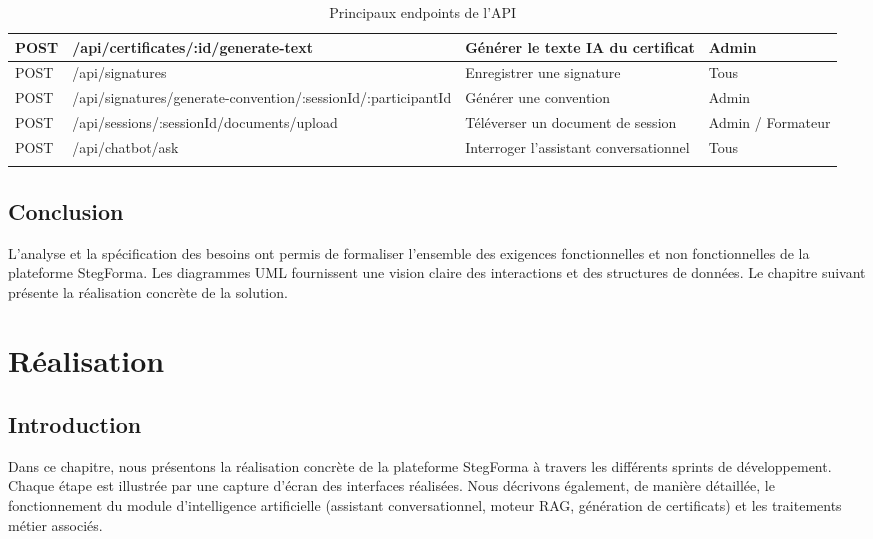 \documentclass[12pt,a4paper,oneside,openany]{report}
\begin{document}
\begin{longtable}{|l|l|p{5.4cm}|p{2.2cm}|}
\hline
POST & /api/certificates/:id/generate-text & Générer le texte IA du certificat & Admin \\
\hline
POST & /api/signatures & Enregistrer une signature & Tous \\
\hline
POST & /api/signatures/generate-convention/:sessionId/:participantId & Générer une convention & Admin \\
\hline
POST & /api/sessions/:sessionId/documents/upload & Téléverser un document de session & Admin / Formateur \\
\hline
POST & /api/chatbot/ask & Interroger l'assistant conversationnel & Tous \\
\hline
\caption{Principaux endpoints de l'API}
\label{tab:api}
\end{longtable}

\enlargethispage{2cm}

\section*{Conclusion}
\hrulefill

L'analyse et la spécification des besoins ont permis de formaliser l'ensemble des exigences fonctionnelles et non fonctionnelles de la plateforme StegForma. Les diagrammes UML fournissent une vision claire des interactions et des structures de données. Le chapitre suivant présente la réalisation concrète de la solution.

\chapter{Réalisation}

\section*{Introduction}

Dans ce chapitre, nous présentons la réalisation concrète de la plateforme StegForma à travers les différents sprints de développement. Chaque étape est illustrée par une capture d'écran des interfaces réalisées. Nous décrivons également, de manière détaillée, le fonctionnement du module d'intelligence artificielle (assistant conversationnel, moteur RAG, génération de certificats) et les traitements métier associés.
\end{document}
